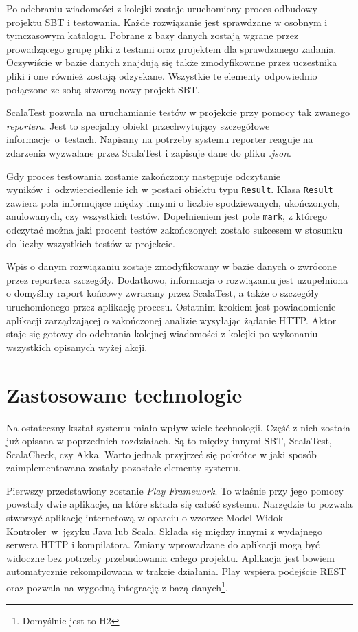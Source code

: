 \documentclass[wimgr]{xmgr}
\begin{document}
Po odebraniu wiadomości z kolejki zostaje uruchomiony proces odbudowy projektu SBT i testowania. Każde rozwiązanie jest sprawdzane w osobnym i tymczasowym katalogu. Pobrane z bazy danych zostają wgrane przez prowadzącego grupę pliki z testami oraz projektem dla sprawdzanego zadania. Oczywiście w bazie danych znajdują się także zmodyfikowane przez uczestnika pliki i one również zostają odzyskane. Wszystkie te elementy odpowiednio połączone ze sobą stworzą nowy projekt SBT. 

ScalaTest pozwala na uruchamianie testów w projekcie przy pomocy tak zwanego \emph{reportera}. Jest to specjalny obiekt przechwytujący szczegółowe informacje~o~testach. Napisany na potrzeby systemu reporter reaguje na zdarzenia wyzwalane przez ScalaTest i zapisuje dane do pliku \emph{.json}. 

Gdy proces testowania zostanie zakończony następuje odczytanie wyników~i~odzwierciedlenie ich w postaci obiektu typu \texttt{Result}. Klasa \texttt{Result} zawiera pola informujące między innymi o liczbie spodziewanych, ukończonych, anulowanych, czy wszystkich testów. Dopełnieniem jest pole \texttt{mark}, z którego odczytać można jaki procent testów zakończonych zostało sukcesem w stosunku do liczby wszystkich testów w projekcie. 

Wpis o danym rozwiązaniu zostaje zmodyfikowany w bazie danych o zwrócone przez reportera szczegóły. Dodatkowo, informacja o rozwiązaniu jest uzupełniona o domyślny raport końcowy zwracany przez ScalaTest, a także o szczegóły uruchomionego przez aplikację procesu. Ostatnim krokiem jest powiadomienie aplikacji zarządzającej o zakończonej analizie wysyłając żądanie HTTP. Aktor staje się gotowy do odebrania kolejnej wiadomości z kolejki po wykonaniu wszystkich opisanych wyżej akcji.

\section{Zastosowane technologie}

Na ostateczny kształ systemu miało wpływ wiele technologii. Część z nich została już opisana w poprzednich rozdziałach. Są to między innymi SBT, ScalaTest, ScalaCheck, czy Akka. Warto jednak przyjrzeć się pokrótce w jaki sposób zaimplementowana zostały pozostałe elementy systemu. 

Pierwszy przedstawiony zostanie \emph{Play Framework}. To właśnie przy jego pomocy powstały dwie aplikacje, na które składa się całość systemu. Narzędzie to pozwala stworzyć aplikację internetową w oparciu o wzorzec Model-Widok-Kontroler~w~języku Java lub Scala. Składa się między innymi z wydajnego serwera HTTP i kompilatora. Zmiany wprowadzane do aplikacji mogą być widoczne bez potrzeby przebudowania całego projektu. Aplikacja jest bowiem automatycznie rekompilowana w trakcie działania. Play wspiera podejście REST oraz pozwala na wygodną integrację z bazą danych\footnote{Domyślnie jest to H2}.
\end{document}
